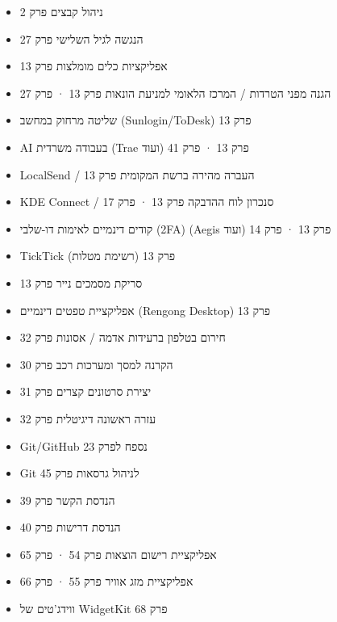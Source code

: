 
\begin{itemize}
  \item ניהול קבצים פרק 2
  \item הנגשה לגיל השלישי פרק 27
  \item אפליקציות כלים מומלצות פרק 13
  \item הגנה מפני הטרדות / המרכז הלאומי למניעת הונאות פרק 13 · פרק 27
  \item שליטה מרחוק במחשב (Sunlogin/ToDesk) פרק 13
  \item AI בעבודה משרדית (Trae ועוד) פרק 13 · פרק 41
  \item LocalSend / העברה מהירה ברשת המקומית פרק 13
  \item KDE Connect / סנכרון לוח ההדבקה פרק 13 · פרק 17
  \item קודים דינמיים לאימות דו-שלבי (2FA) (Aegis ועוד) פרק 13 · פרק 14
  \item TickTick (רשימת מטלות) פרק 13
  \item סריקת מסמכים נייר פרק 13
  \item אפליקציית טפטים דינמיים (Rengong Desktop) פרק 13
  \item חירום בטלפון ברעידות אדמה / אסונות פרק 32
  \item הקרנה למסך ומערכות רכב פרק 30
  \item יצירת סרטונים קצרים פרק 31
  \item עזרה ראשונה דיגיטלית פרק 32
  \item Git/GitHub נספח לפרק 23
  \item Git לניהול גרסאות פרק 45
  \item הנדסת הקשר פרק 39
  \item הנדסת דרישות פרק 40
  \item אפליקציית רישום הוצאות פרק 54 · פרק 65
  \item אפליקציית מזג אוויר פרק 55 · פרק 66
  \item ווידג'טים של WidgetKit פרק 68
\end{itemize}

